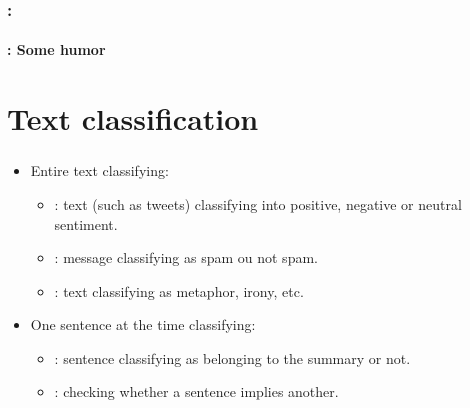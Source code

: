 \documentclass[xcolor=table]{beamer}
\begin{document}
\begin{frame}
	\frametitle{\insertshortsubtitle: \insertsection}
	\framesubtitle{\insertsubsection: Some humor}
	
	\begin{center}
	\end{center}
	
\end{frame}


\section{Text classification}

\begin{frame}
	\frametitle{\insertshortsubtitle}
	\framesubtitle{\insertsection}
	
	\begin{itemize}
		\item Entire text classifying:
		\begin{itemize}
			\item {}: text (such as tweets) classifying into positive, negative or neutral sentiment.
			\item {}: message classifying as spam ou not spam.
			\item {}: text classifying as metaphor, irony, etc.
		\end{itemize}
		\item One sentence at the time classifying:
		\begin{itemize}
			\item {}: sentence classifying as belonging to the summary or not.
			\item {}: checking whether a sentence implies another.
		\end{itemize}
	\end{itemize}
	
\end{frame}
\end{document}
